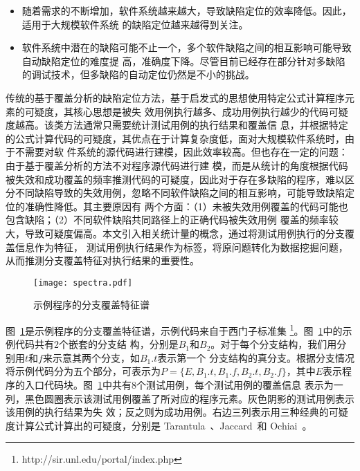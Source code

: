 \begin{itemize}
      \item 随着需求的不断增加，软件系统越来越大，导致缺陷定位的效率降低。因此，适用于大规模软件系统
   的缺陷定位越来越得到关注。
      \item 软件系统中潜在的缺陷可能不止一个，多个软件缺陷之间的相互影响可能导致自动缺陷定位的难度提
      高，准确度下降。尽管目前已经存在部分针对多缺陷的调试技术，但多缺陷的自动定位仍然是不小的挑战。
\end{itemize}

传统的基于覆盖分析的缺陷定位方法，基于启发式的思想使用特定公式计算程序元素的可疑度，其核心思想是被失
效用例执行越多、成功用例执行越少的代码可疑度越高。该类方法通常只需要统计测试用例的执行结果和覆盖信
息，并根据特定的公式计算代码的可疑度，其优点在于计算复杂度低，面对大规模软件系统时，由于不需要对软
件系统的源代码进行建模，因此效率较高。但也存在一定的问题：由于基于覆盖分析的方法不对程序源代码进行建
模，而是从统计的角度根据代码被失效和成功覆盖的频率推测代码的可疑度，因此对于存在多缺陷的程序，难以区
分不同缺陷导致的失效用例，忽略不同软件缺陷之间的相互影响，可能导致缺陷定位的准确性降低。其主要原因有
两个方面：（1）未被失效用例覆盖的代码可能也包含缺陷；（2）不同软件缺陷共同路径上的正确代码被失效用例
覆盖的频率较大，导致可疑度偏高。本文引入相关统计量的概念，通过将测试用例执行的分支覆盖信息作为特征，
测试用例执行结果作为标签，将原问题转化为数据挖掘问题，从而推测分支覆盖特征对执行结果的重要性。

\begin{figure}[htp]
      \centering
      \texttt{[image: spectra.pdf]}
      \caption{示例程序的分支覆盖特征谱}
      \label{fig:spectra}
\end{figure}

图~\ref{fig:spectra}是示例程序的分支覆盖特征谱，示例代码来自于西门子标准集
\footnote{http://sir.unl.edu/portal/index.php}。图~\ref{fig:spectra}中的示例代码共有2个嵌套的分支结
构，分别是$B_1$和$B_2$。对于每个分支结构，我们用分别用$t$和$f$来示意其两个分支，如$B_1.t$表示第一个
分支结构的真分支。根据分支情况将示例代码分为五个部分，可表示为$P = \{E, B_1.t, B_1.f, B_2.t,
B_2.f\}$，其中$E$表示程序的入口代码块。图~\ref{fig:spectra}中共有8个测试用例，每个测试用例的覆盖信息
表示为一列，黑色圆圈表示该测试用例覆盖了所对应的程序元素。灰色阴影的测试用例表示该用例的执行结果为失
效；反之则为成功用例。右边三列表示用三种经典的可疑度计算公式计算出的可疑度，分别是
Tarantula~\cite{jones2005empirical}、Jaccard~\cite{abreu2007accuracy}和
Ochiai~\cite{abreu2007accuracy}。

